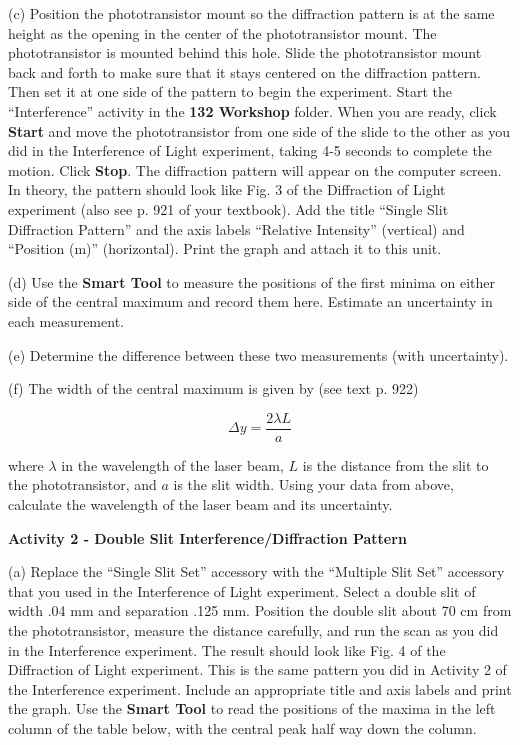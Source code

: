 (c) Position the phototransistor mount so the diffraction pattern is at the 
same height as the opening in the center of the phototransistor mount. The 
phototransistor is mounted behind this hole. Slide the phototransistor mount 
back and forth to make sure that it stays centered on the diffraction pattern. 
Then set it at one side of the pattern to begin the experiment. Start the 
``Interference'' activity in the \textbf{132 Workshop} folder. When you are 
ready, click \textbf{Start} and move the phototransistor from one side of the 
slide to the other as you did in the Interference of Light experiment, taking 
4-5 seconds to complete the motion. Click \textbf{Stop}. The diffraction 
pattern will appear on the computer screen. In theory, the pattern should look 
like Fig. 3 of the Diffraction of Light experiment (also see p. 921 of your 
textbook). Add the title ``Single Slit Diffraction Pattern'' and the axis 
labels ``Relative Intensity'' (vertical) and ``Position (m)'' (horizontal). 
Print the graph and attach it to this unit.

(d) Use the \textbf{Smart Tool} to measure the positions of the first minima 
on either side of the central maximum and record them here. Estimate an 
uncertainty in each measurement.
\vspace{15mm}

\newpage

(e) Determine the difference between these two measurements (with uncertainty).
\vspace{15mm}

(f) The width of the central maximum is given by (see text p. 922)

\[\Delta y = \frac{2 \lambda L}{a}\]

where \( \lambda \) in the wavelength of the laser beam, $L$ is the distance 
from the slit to the phototransistor, and $a$ is the slit width. Using your 
data from above, calculate the wavelength of the laser beam and its uncertainty.
\vspace{30mm}

\textbf{Activity 2 - Double Slit Interference/Diffraction Pattern}

(a) Replace the ``Single Slit Set'' accessory with the ``Multiple Slit Set'' 
accessory that you used in the Interference of Light experiment.  Select a 
double slit of width .04 mm and separation .125 mm. Position the double slit 
about 70 cm from the phototransistor, measure the distance carefully, and run 
the scan as you did in the Interference experiment. The result should look like 
Fig. 4 of the Diffraction of Light experiment. This is the same pattern you did 
in Activity 2 of the Interference experiment. Include an appropriate title and 
axis labels and print the graph. Use the \textbf{Smart Tool} to read the 
positions of the maxima in the left column of the table below, with the 
central peak half way down the column.

